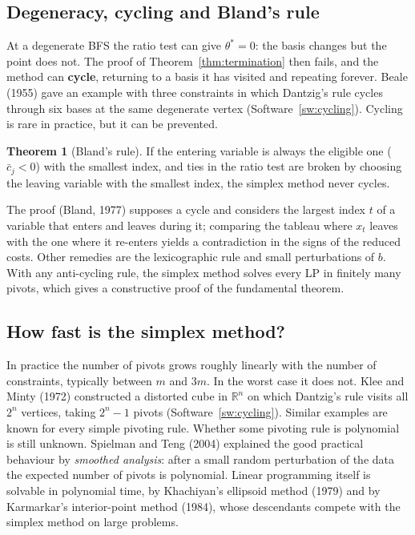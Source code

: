 \documentclass[11pt,a4paper]{article}
\numberwithin{equation}{section}
\theoremstyle{definition}
\newtheorem{thm}{Theorem}[subsection]
\begin{document}
\subsection{Degeneracy, cycling and Bland's rule}
\label{ssec:cycling}

At a degenerate BFS the ratio test can give $\theta^* = 0$: the basis changes but the point does not. The proof of Theorem~\ref{thm:termination} then fails, and the method can \textbf{cycle}, returning to a basis it has visited and repeating forever. Beale (1955) gave an example with three constraints in which
Dantzig's rule cycles through six bases at the same degenerate vertex (Software~\ref{sw:cycling}). Cycling is rare in practice, but it can be prevented.

\begin{thm}[Bland's rule]
\label{thm:bland}
If the entering variable is always the eligible one ($\bar c_j < 0$) with the smallest index, and ties in the ratio test are broken by choosing the leaving variable with the smallest index, the simplex method never cycles.
\end{thm}

The proof (Bland, 1977) supposes a cycle and considers the largest index $t$ of a variable that enters and leaves during it; comparing the tableau where $x_t$ leaves with the one where it re-enters yields a contradiction in the signs of the reduced costs. Other remedies are the lexicographic rule and small perturbations
of $b$. With any anti-cycling rule, the simplex method solves every LP in finitely many pivots, which gives a constructive proof of the fundamental theorem.

\subsection{How fast is the simplex method?}
\label{ssec:complexity}

In practice the number of pivots grows roughly linearly with the number of constraints, typically between $m$ and $3m$. In the worst case it does not. Klee and Minty (1972) constructed a distorted cube in $\mathbb R^n$ on which Dantzig's rule visits all $2^n$ vertices, taking $2^n - 1$ pivots (Software~\ref{sw:cycling}).
Similar examples are known for every simple pivoting rule. Whether some pivoting rule is polynomial is still unknown. Spielman and Teng (2004) explained the good practical behaviour by \emph{smoothed analysis}: after a small random perturbation of the data the expected number of pivots is polynomial. Linear programming itself
is solvable in polynomial time, by Khachiyan's ellipsoid method (1979) and by Karmarkar's interior-point method (1984), whose descendants compete with the simplex method on large problems.
\end{document}
